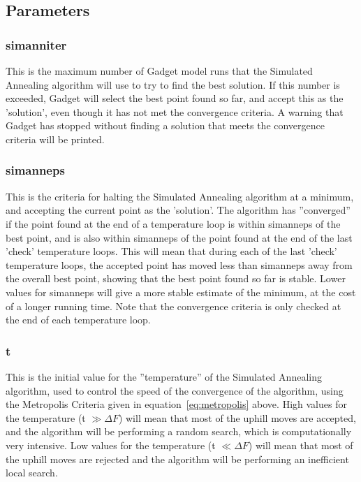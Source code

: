 \documentclass[10pt,twoside]{book}
\begin{document}
\subsection{Parameters}\label{subsec:simannpar}
\subsubsection{simanniter}
This is the maximum number of Gadget model runs that the Simulated Annealing algorithm will use to try to find the best solution.  If this number is exceeded, Gadget will select the best point found so far, and accept this as the 'solution', even though it has not met the convergence criteria.  A warning that Gadget has stopped without finding a solution that meets the convergence criteria will be printed.

\subsubsection{simanneps}
This is the criteria for halting the Simulated Annealing algorithm at a minimum, and accepting the current point as the 'solution'.  The algorithm has ''converged'' if the point found at the end of a temperature loop is within simanneps of the best point, and is also within simanneps of the point found at the end of the last 'check' temperature loops.  This will mean that during each of the last 'check' temperature loops, the accepted point has moved less than simanneps away from the overall best point, showing that the best point found so far is stable.  Lower values for simanneps will give a more stable estimate of the minimum, at the cost of a longer running time.  Note that the convergence criteria is only checked at the end of each temperature loop.

\subsubsection{t}
This is the initial value for the ''temperature'' of the Simulated Annealing algorithm, used to control the speed of the convergence of the algorithm, using the Metropolis Criteria given in equation~\ref{eq:metropolis} above.  High values for the temperature (t $\gg \Delta F$) will mean that most of the uphill moves are accepted, and the algorithm will be performing a random search, which is computationally very intensive.  Low values for the temperature (t $\ll \Delta F$) will mean that most of the uphill moves are rejected and the algorithm will be performing an inefficient local search.
\end{document}

